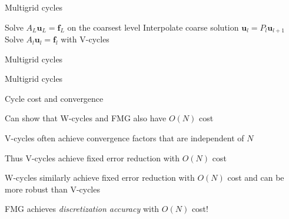 \documentclass[18pt,xcolor=table]{beamer}
\begin{document}
\begin{frame}{Multigrid cycles}
\begin{algorithm}[H]
\caption{Full multigrid (FMG)}
\begin{algorithmic}
\State Solve $A_L\mathbf{u}_L = \mathbf{f}_L$ on the coarsest level
\State Interpolate coarse solution $\mathbf{u}_l = P_l\mathbf{u}_{l+1}$
\State Solve $A_l\mathbf{u}_l = \mathbf{f}_l$ with V-cycles
\EndFor
\end{algorithmic}
\end{algorithm}
\end{frame}

\begin{frame}{Multigrid cycles}
\begin{center}
\end{center}
\end{frame}

\begin{frame}{Multigrid cycles}
\begin{block}{Cycle cost and convergence}
\bit
\item Can show that W-cycles and FMG also have $O(N)$ cost
\item V-cycles often achieve convergence factors that are independent of $N$
\item Thus V-cycles achieve fixed error reduction with $O(N)$ cost
\item W-cycles similarly achieve fixed error reduction with $O(N)$ cost and can be more robust than V-cycles
\item FMG achieves \emph{discretization accuracy} with $O(N)$ cost!
\eit
\end{block}
\end{frame}


\end{document}
